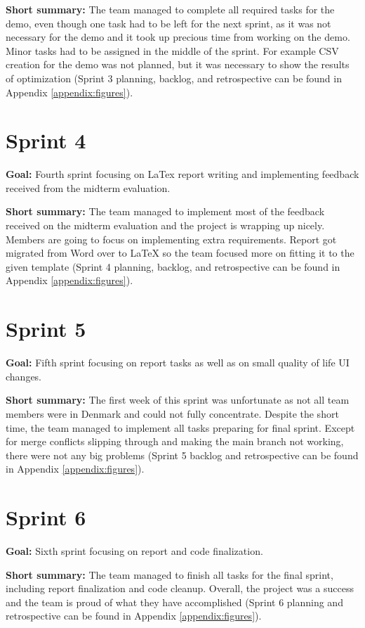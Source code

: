 \medskip
\noindent \textbf{Short summary:} The team managed to complete all required tasks for the demo, even though one task had to be left 
for the next sprint, as it was not necessary for the demo and it took up precious time from 
working on the demo. Minor tasks had to be assigned in the middle of the sprint. For example CSV creation for the demo was not planned, but it was necessary to show the results of optimization (Sprint 3 planning, backlog, and retrospective can be found in Appendix \ref{appendix:figures}).

\section{Sprint 4}
\textbf{Goal:} Fourth sprint focusing on LaTex report writing and implementing feedback received from the midterm evaluation.

\medskip
\noindent \textbf{Short summary:} The team managed to implement most of the feedback received on the midterm evaluation and the project
is wrapping up nicely. Members are going to focus on implementing extra 
requirements. Report got migrated from Word over to LaTeX so the team focused more on fitting it to the given template (Sprint 4 planning, backlog, and retrospective can be found in Appendix \ref{appendix:figures}).

\section{Sprint 5}
\textbf{Goal:} Fifth sprint focusing on report tasks as well as on small quality of life UI changes.

\medskip
\noindent \textbf{Short summary:} The first week of this sprint was unfortunate as not all team members were in Denmark and could not fully concentrate. Despite the short time, the team managed to implement all tasks preparing for final 
sprint. Except for merge conflicts slipping through and making the main branch not 
working, there were not any big problems (Sprint 5 backlog and retrospective can be found in Appendix \ref{appendix:figures}).

\section{Sprint 6}
\textbf{Goal:} Sixth sprint focusing on report and code finalization.

\medskip
\noindent \textbf{Short summary:} The team managed to finish all tasks for the final sprint, including report finalization and code cleanup. Overall, the project was a success and the team is proud of what they have accomplished (Sprint 6 planning and retrospective can be found in Appendix \ref{appendix:figures}).
